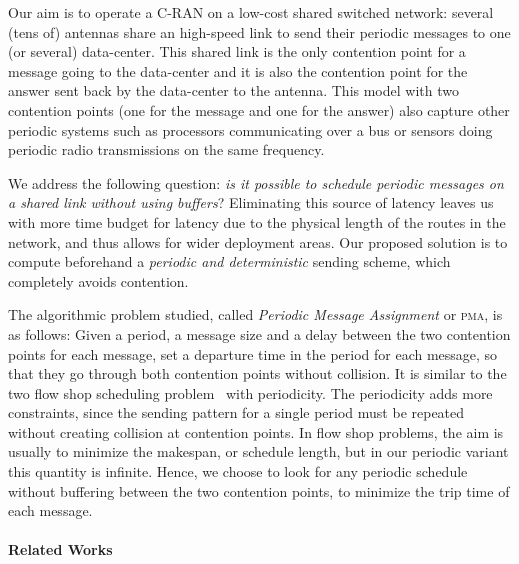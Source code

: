 \documentclass[a4paper,UKenglish,cleveref, autoref, thm-restate]{lipics-v2019}
\newcommand\pma{\textsc{pma}\xspace}
\begin{document}
Our aim is to operate a C-RAN on a low-cost shared switched network: several (tens of) antennas share an high-speed link to send their periodic messages to one (or several) data-center.
This shared link is the only contention point for a message going to the data-center and it is also the contention point for the answer sent back by the data-center to the antenna.
This model with two contention points (one for the message and one for the answer) also capture other periodic systems such as processors communicating over a bus or sensors doing periodic radio transmissions on the same frequency.

We address the following question: \emph{is it possible to schedule periodic messages on a shared link without using buffers}? Eliminating this source of latency leaves us with more time budget for latency due to the physical length of the routes in the network, and thus allows for wider deployment areas. Our proposed solution is to compute beforehand a \emph{periodic and deterministic} sending scheme, which completely avoids contention.  

The algorithmic problem studied, called \emph{Periodic Message Assignment} or \pma, is as follows:
Given a period, a message size and a delay between the two contention points for each message, set a departure time in the period for each message, so that they go through both contention points without collision. It is similar to the two flow shop scheduling problem~\cite{yu2004minimizing} with periodicity. The periodicity adds more constraints, since the sending pattern for a single period must be repeated without creating collision at contention points. In flow shop problems, the aim is usually to minimize the makespan, or schedule length, but in our periodic variant this quantity is infinite. Hence, we choose to look for any periodic schedule without buffering between the two contention points, to minimize the trip time of each message. 


\paragraph*{Related Works}
\end{document}
